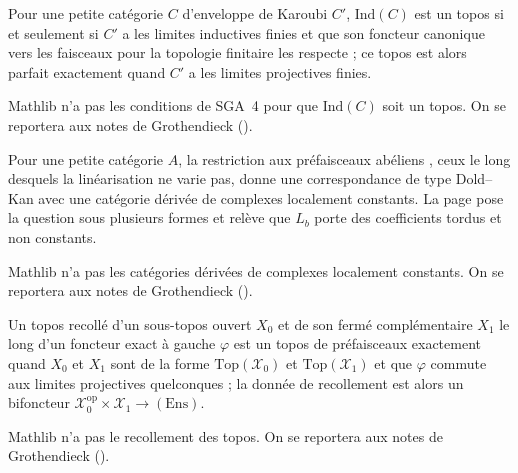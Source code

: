 \begin{encadre}
\begin{theoreme*}\nonverifie
Pour une petite catégorie $C$ d'enveloppe de Karoubi $C'$, $\mathrm{Ind}(C)$ est un topos si et seulement si $C'$ a les limites inductives finies et que son foncteur canonique vers les faisceaux pour la topologie finitaire les respecte ; ce topos est alors parfait exactement quand $C'$ a les limites projectives finies.
\end{theoreme*}
\end{encadre}
{\small Mathlib n'a pas les conditions de SGA~4 pour que $\mathrm{Ind}(C)$ soit un topos. On se reportera aux notes de Grothendieck ().\par}

\begin{encadre}
\begin{conjecture*}
Pour une petite catégorie $A$, la restriction aux préfaisceaux abéliens , ceux le long desquels la linéarisation ne varie pas, donne une correspondance de type Dold--Kan avec une catégorie dérivée de complexes localement constants. La page pose la question sous plusieurs formes et relève que $L_b$ porte des coefficients tordus et non constants.
\end{conjecture*}
\end{encadre}
{\small Mathlib n'a pas les catégories dérivées de complexes localement constants. On se reportera aux notes de Grothendieck ().\par}

\begin{encadre}
\begin{theoreme*}\nonverifie
Un topos recollé d'un sous-topos ouvert $X_0$ et de son fermé complémentaire $X_1$ le long d'un foncteur exact à gauche $\varphi$ est un topos de préfaisceaux exactement quand $X_0$ et $X_1$ sont de la forme $\mathrm{Top}(\mathcal X_0)$ et $\mathrm{Top}(\mathcal X_1)$ et que $\varphi$ commute aux limites projectives quelconques ; la donnée de recollement est alors un bifoncteur $\mathcal X_0^{\mathrm{op}} \times \mathcal X_1 \to (\mathrm{Ens})$.
\end{theoreme*}
\end{encadre}
{\small Mathlib n'a pas le recollement des topos. On se reportera aux notes de Grothendieck ().\par}
